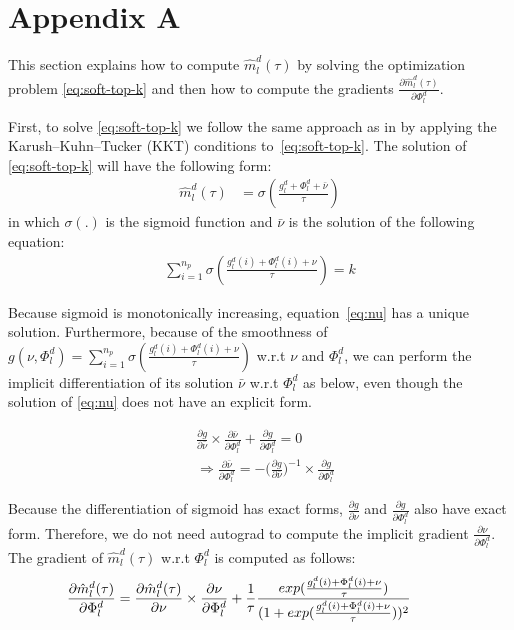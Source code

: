 \documentclass[11pt]{article}
\begin{document}


\appendix
\section{Appendix A}
\label{appendix:a}
This section explains how to compute $\hat{m}_l^d(\tau)$ by solving the optimization problem \eqref{eq:soft-top-k} and then how to compute the gradients $\frac{\partial \hat{m}_l^d(\tau)}{\partial \Phi_l^d}$.

First, to solve \eqref{eq:soft-top-k} we follow the same approach as in \cite{amos19lml,amos20differential} by applying the Karush–Kuhn–Tucker (KKT) conditions to~\eqref{eq:soft-top-k}. The solution of \eqref{eq:soft-top-k} will have the following form:
\begin{align}
\hat{m}_l^d(\tau) &= \sigma(\frac{g_l^d + \Phi_l^d + \bar{\nu}}{\tau}) \label{eq:soft-m}
\end{align}
in which $\sigma(.)$ is the sigmoid function and $\bar{\nu}$ is the solution of the following equation:
\begin{align}
\displaystyle{\mathop{\sum}_{i=1}^{n_p}} \sigma(\frac{g_l^d(i) + \Phi_l^d(i) + \nu}{\tau}) = k \label{eq:nu}
\end{align}

Because sigmoid is monotonically increasing, equation~\eqref{eq:nu} has a unique solution. Furthermore,  because of the smoothness of $g(\nu,\Phi_l^d) = \displaystyle{\mathop{\sum}_{i=1}^{n_p}} \sigma(\frac{g_l^d(i) + \Phi_l^d(i) + \nu}{\tau})$ w.r.t $\nu$ and $\Phi_l^d$, we can perform the implicit differentiation of its solution $\bar{\nu}$ w.r.t $\Phi_l^d$ as below, even though the solution of \eqref{eq:nu} does not have an explicit form.

\begin{align*}
&\frac{\partial g}{\partial \bar{\nu}} \times \frac{\partial \bar{\nu}}{\partial \Phi_l^d} + \frac{\partial g}{\partial \Phi_l^d} = 0 \\
& \Rightarrow \frac{\partial \bar{\nu}}{\partial \Phi_l^d} = - \big(\frac{\partial g}{\partial \bar{\nu}}\big)^{-1} \times \frac{\partial g}{\partial \Phi_l^d}
\end{align*}

Because the differentiation of sigmoid has exact forms, $\frac{\partial g}{\partial \nu}$ and $\frac{\partial g}{\partial \Phi_l^d}$ also have exact form. Therefore, we do not need autograd to compute the implicit gradient $\frac{\partial \nu}{\partial \Phi_l^d}$. The gradient of $\hat{m}_l^d(\tau)$ w.r.t $\Phi_l^d$ is computed as follows:
\begin{align}
\hspace{-3.em}
\frac{\partial \hat{m}_l^d(\tau)}{\partial \Phi_l^d} = \frac{\partial \hat{m}_l^d(\tau)}{\partial \nu} \times \frac{\partial \nu}{\partial \Phi_l^d} + \frac{1}{\tau} \frac{exp(\frac{g_l^d(i) + \Phi_l^d(i) + \nu}{\tau})}{(1+exp(\frac{g_l^d(i) + \Phi_l^d(i) + \nu}{\tau}))^2}
\end{align}
\end{document}
